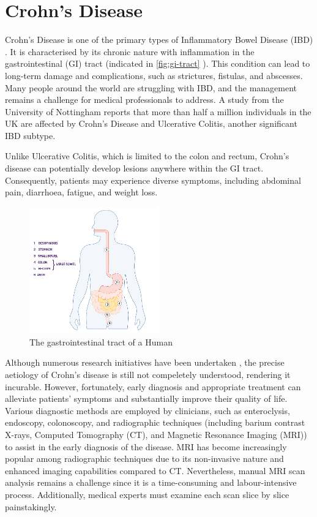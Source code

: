 \section{Crohn's Disease}
Crohn's Disease \cite{baumgart2012crohn,crohnsNHS} is one of the primary types of Inflammatory Bowel Disease (IBD) \cite{IBDCDC}. It is characterised by its chronic nature with inflammation in the gastrointestinal (GI) tract (indicated in \autoref{fig:gi-tract} \cite{digestio98:online}). This condition can lead to long-term damage and complications, such as strictures, fistulas, and abscesses. Many people around the world are struggling with IBD, and the management remains a challenge for medical professionals to address. A study from the University of Nottingham \cite{UoNResearch} reports that more than half a million individuals in the UK are affected by Crohn's Disease and Ulcerative Colitis, another significant IBD subtype. 

Unlike Ulcerative Colitis, which is limited to the colon and rectum, Crohn's disease can potentially develop lesions anywhere within the GI tract. Consequently, patients may experience diverse symptoms, including abdominal pain, diarrhoea, fatigue, and weight loss.
\begin{figure}[htp]
    \centering
    \includegraphics[width=0.5\textwidth]{figures/digestion-graphic.jpg}
    \caption{The gastrointestinal tract of a Human}
    \label{fig:gi-tract}
\end{figure}

Although numerous research initiatives have been undertaken \cite{hoarau2016bacteriome,feuerstein2021aga}, the precise aetiology of Crohn's disease is still not compeletely understood, rendering it incurable. However, fortunately, early diagnosis and appropriate treatment can alleviate patients' symptoms and substantially improve their quality of life. Various diagnostic methods are employed by clinicians, such as enteroclysis, endoscopy, colonoscopy, and radiographic techniques (including barium contrast X-rays, Computed Tomography (CT), and Magnetic Resonance Imaging (MRI)) to assist in the early diagnosis of the disease. MRI has become increasingly popular among radiographic techniques due to its non-invasive nature and enhanced imaging capabilities compared to CT. Nevertheless, manual MRI scan analysis remains a challenge since it is a time-consuming and labour-intensive process. Additionally, medical experts must examine each scan slice by slice painstakingly.

